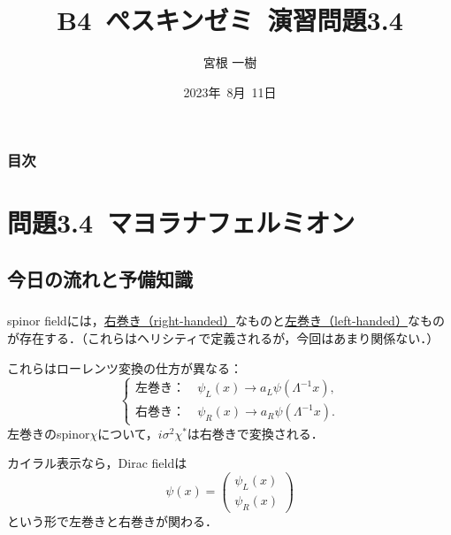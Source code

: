 \documentclass[pdflatex,unicode,ja=standard,12pt]{beamer}
\title{B4\ ぺスキンゼミ\ 演習問題3.4}
\author{宮根 一樹}
\date{2023年\ 8月\ 11日}
\begin{document}
\begin{frame}
  \titlepage
\end{frame}

\begin{frame}%
  \frametitle{目次}
  \tableofcontents
\end{frame}

\setcounter{section}{0}

\section{問題3.4\ マヨラナフェルミオン}

\subsection{今日の流れと予備知識}

\begin{frame}%

  \frametitle{\subsecname}









\end{frame}


\begin{frame}%

  \frametitle{\subsecname}

  spinor fieldには，\uline{右巻き（right-handed）}なものと\uline{左巻き（left-handed）}なものが存在する．（これらはヘリシティで定義されるが，今回はあまり関係ない．）

  \vspace{10pt}

  これらはローレンツ変換の仕方が異なる：
  \begin{equation}
    \left\{
      \begin{alignedat}{1}
        \text{左巻き：}&\ 
        \psi_{L}(x)
        \rightarrow
        a_{L}\psi(\Lambda^{-1}x)
        ,
        \\
        \text{右巻き：}&\ 
        \psi_{R}(x)
        \rightarrow
        a_{R}\psi(\Lambda^{-1}x)
        .
      \end{alignedat}
    \right.
  \end{equation}
  左巻きのspinor$\chi$について，$i\sigma^2\chi^{*}$は右巻きで変換される．

  \vspace{10pt}

  カイラル表示なら，Dirac fieldは
  \begin{equation}
    \psi(x)
    =
    \begin{pmatrix}
      \psi_{L}(x) \\
      \psi_{R}(x)
    \end{pmatrix}
  \end{equation}
  という形で左巻きと右巻きが関わる．

\end{frame}
\end{document}
